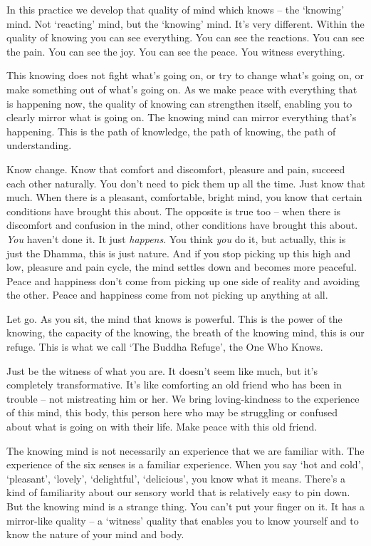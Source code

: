 

\vspace*{0.4\baselineskip}
In this practice we develop that quality of mind which knows -- the `knowing' mind. Not `reacting' mind, but the `knowing' mind. It's very different. Within the quality of knowing you can see everything. You can see the reactions. You can see the pain. You can see the joy. You can see the peace. You witness everything. 

This knowing does not fight what's going on, or try to change what's going on, or make something out of what's going on.  As we make peace with everything  that is happening now, the quality of knowing can strengthen itself, enabling you to clearly mirror what is going on. The knowing mind can mirror everything that's happening. This is the path of knowledge, the path of knowing, the path of understanding. 

Know change. Know that comfort and discomfort, pleasure and pain, succeed each other naturally. You don't need to pick them up all the time. Just know that much. When there is a pleasant, comfortable, bright mind, you know that certain conditions have brought this about. The opposite is true too -- when there is discomfort and confusion in the mind, other conditions have brought this about. \textit{You} haven't done it. It just \textit{happens}. You think \textit{you} do it, but actually, this is just the Dhamma, this is just nature. And if you stop picking up this high and low, pleasure and pain cycle, the mind settles down and becomes more peaceful. Peace and happiness don't come from picking up one side of reality and avoiding the other. Peace and happiness come from not picking up anything at all.

Let go. As you sit, the mind that knows is powerful. This is the power of the knowing, the capacity of the knowing, the breath of the knowing mind, this is our refuge. This is what we call `The Buddha Refuge', the One Who Knows.

Just be the witness of what you are. It doesn't seem like much, but it's completely transformative. It's like comforting an old friend who has been in trouble -- not mistreating him or her. We bring loving-kindness to the experience of this mind, this body, this person here who may be struggling or confused about what is going on with their life. Make peace with this old friend. 

The knowing mind is not necessarily an experience that we are familiar with. The experience of the six senses is a familiar experience. When you say `hot and cold', `pleasant', `lovely', `delightful', `delicious', you know what it means. There's a kind of familiarity about our sensory world that is relatively easy to pin down. But the knowing mind is a strange thing. You can't put your finger on it. It has a mirror-like quality -- a `witness' quality that enables you to know yourself and to know the nature of your mind and body. 

